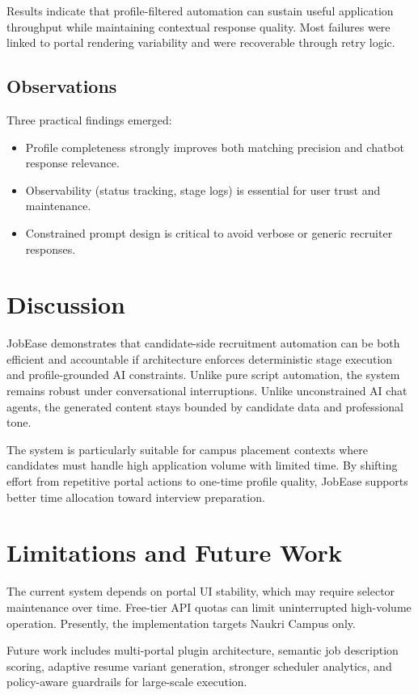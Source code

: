 \documentclass[conference]{IEEEtran}
\begin{document}
Results indicate that profile-filtered automation can sustain useful application throughput while maintaining contextual response quality. Most failures were linked to portal rendering variability and were recoverable through retry logic.

\subsection{Observations}
Three practical findings emerged:
\begin{itemize}
    \item Profile completeness strongly improves both matching precision and chatbot response relevance.
    \item Observability (status tracking, stage logs) is essential for user trust and maintenance.
    \item Constrained prompt design is critical to avoid verbose or generic recruiter responses.
\end{itemize}

\section{Discussion}
JobEase demonstrates that candidate-side recruitment automation can be both efficient and accountable if architecture enforces deterministic stage execution and profile-grounded AI constraints. Unlike pure script automation, the system remains robust under conversational interruptions. Unlike unconstrained AI chat agents, the generated content stays bounded by candidate data and professional tone.

The system is particularly suitable for campus placement contexts where candidates must handle high application volume with limited time. By shifting effort from repetitive portal actions to one-time profile quality, JobEase supports better time allocation toward interview preparation.

\section{Limitations and Future Work}
The current system depends on portal UI stability, which may require selector maintenance over time. Free-tier API quotas can limit uninterrupted high-volume operation. Presently, the implementation targets Naukri Campus only.

Future work includes multi-portal plugin architecture, semantic job description scoring, adaptive resume variant generation, stronger scheduler analytics, and policy-aware guardrails for large-scale execution.
\end{document}
